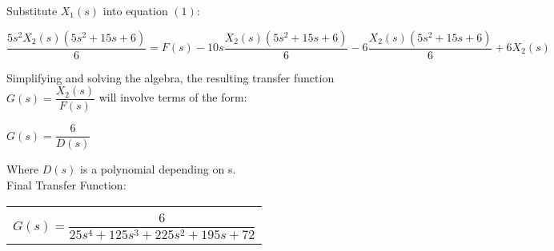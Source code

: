 \documentclass[11pt,letterpaper]{article}
\begin{document}
Substitute $X_1(s)$ into equation $(1)$:\\
\begin{center}
	$\dfrac{5s^2X_2(s)(5s^2+15s+6)}{6}=F(s)-10s\dfrac{X_2(s)(5s^2+15s+6)}{6}-6\dfrac{X_2(s)(5s^2+15s+6)}{6}+6X_2(s)$\\
\end{center}
Simplifying and solving the algebra, the resulting transfer function $G(s)=\dfrac{X_2(s)}{F(s)}$ will involve terms of the
form:\\
\begin{center}
	$G(s)=\dfrac{6}{D(s)}$\\
\end{center}
Where $D(s)$ is a polynomial depending on s.\\[12pt]
Final Transfer Function:\\
\begin{center}
	\begin{tabular}{|c|}
		\hline \\
		$G(s)=\dfrac{6}{25s^4+125s^3+225s^2+195s+72}$\\[12pt]
	\hline
	\end{tabular}	
\end{center}

\clearpage
\end{document}
